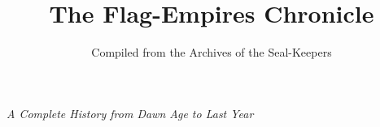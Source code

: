 \documentclass[12pt,twoside,openright]{book}
\title{The Flag-Empires Chronicle}
\author{Compiled from the Archives of the Seal-Keepers}
\date{}
\begin{document}
\frontmatter
\maketitle

\clearpage
\vspace*{\fill}
\begin{center}
\emph{A Complete History from Dawn Age to Last Year}
\end{center}
\vspace*{\fill}
\clearpage

\tableofcontents
\clearpage

\mainmatter


\end{document}
